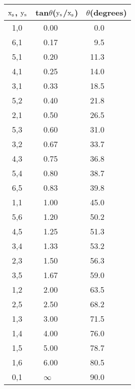  \vspace{3mm}
 \hspace{3.1cm}
 \begin{minipage}{10cm}   
 \begin{tabular}{|l|l|l|}
       \hline
  ${\rm x_s}$, ${\rm y_s}$ & tan$\theta $(${\rm y_s}$/${\rm x_s}$) &
  $\theta $(degrees) \\
       \hline
  \ 1,0 & \ \ 0.00 & \ \ 0.0 \\[-3mm]
  \ 6,1 & \ \ 0.17 & \ \ 9.5 \\[-3mm]
  \ 5,1 & \ \ 0.20 & \ 11.3  \\[-3mm]
  \ 4,1 & \ \ 0.25 & \ 14.0  \\[-3mm]
  \ 3,1 & \ \ 0.33 & \ 18.5  \\[-3mm]
  \ 5,2 & \ \ 0.40 & \ 21.8  \\[-3mm]
  \ 2,1 & \ \ 0.50 & \ 26.5  \\[-3mm]
  \ 5,3 & \ \ 0.60 & \ 31.0  \\[-3mm]
  \ 3,2 & \ \ 0.67 & \ 33.7  \\[-3mm]
  \ 4,3 & \ \ 0.75 & \ 36.8  \\[-3mm]
  \ 5,4 & \ \ 0.80 & \ 38.7  \\[-3mm]
  \ 6,5 & \ \ 0.83 & \ 39.8  \\[-3mm]
  \ 1,1 & \ \ 1.00 & \ 45.0  \\[-3mm]
  \ 5,6 & \ \ 1.20 & \ 50.2  \\[-3mm]
  \ 4,5 & \ \ 1.25 & \ 51.3  \\[-3mm]
  \ 3,4 & \ \ 1.33 & \ 53.2  \\[-3mm]
  \ 2,3 & \ \ 1.50 & \ 56.3  \\[-3mm]
  \ 3,5 & \ \ 1.67 & \ 59.0  \\[-3mm]
  \ 1,2 & \ \ 2.00 & \ 63.5  \\[-3mm]
  \ 2,5 & \ \ 2.50 & \ 68.2  \\[-3mm]
  \ 1,3 & \ \ 3.00 & \ 71.5  \\[-3mm]
  \ 1,4 & \ \ 4.00 & \ 76.0  \\[-3mm]
  \ 1,5 & \ \ 5.00 & \ 78.7  \\[-3mm]
  \ 1,6 & \ \ 6.00 & \ 80.5  \\[-3mm]
  \ 0,1 & \ \ $\infty $& \ 90.0 \\
       \hline
 \end{tabular}
 \end{minipage}


 
 





